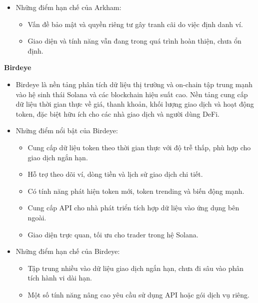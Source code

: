 \documentclass{article}[14pt]
\begin{document}
{    \begin{itemize}
        \item Những điểm hạn chế của Arkham:
        \begin{itemize}
            \item Vấn đề bảo mật và quyền riêng tư gây tranh cãi do việc định danh ví.
            \item Giao diện và tính năng vẫn đang trong quá trình hoàn thiện, chưa ổn định.
        \end{itemize}
    \end{itemize}

\textbf{Birdeye} \cite{birdeye}
    
\begin{itemize}
    \item Birdeye là nền tảng phân tích dữ liệu thị trường và on-chain tập trung mạnh vào hệ sinh thái Solana và các blockchain hiệu suất cao. Nền tảng cung cấp dữ liệu thời gian thực về giá, thanh khoản, khối lượng giao dịch và hoạt động token, đặc biệt hữu ích cho các nhà giao dịch và người dùng DeFi.

    \item Những điểm nổi bật của Birdeye:
    \begin{itemize}
        \item Cung cấp dữ liệu token theo thời gian thực với độ trễ thấp, phù hợp cho giao dịch ngắn hạn.
        \item Hỗ trợ theo dõi ví, dòng tiền và lịch sử giao dịch chi tiết.
        \item Có tính năng phát hiện token mới, token trending và biến động mạnh.
        \item Cung cấp API cho nhà phát triển tích hợp dữ liệu vào ứng dụng bên ngoài.
        \item Giao diện trực quan, tối ưu cho trader trong hệ Solana.
    \end{itemize}
\end{itemize}

\begin{itemize}
    \item Những điểm hạn chế của Birdeye:
    \begin{itemize}
        \item Tập trung nhiều vào dữ liệu giao dịch ngắn hạn, chưa đi sâu vào phân tích hành vi dài hạn.
        \item Một số tính năng nâng cao yêu cầu sử dụng API hoặc gói dịch vụ riêng.
    \end{itemize}
\end{itemize}

}
\end{document}
